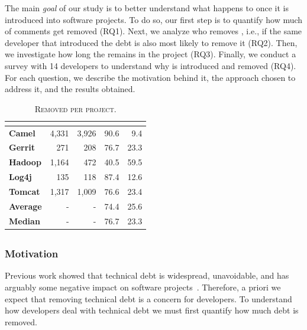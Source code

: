 The main \emph{goal} of our study is to better understand what happens to \SATD once it is introduced into software projects. To do so, our first step is to quantify how much of \SATD comments get removed (RQ1). Next, we analyze who removes \SATD, i.e., if the same developer that introduced the debt is also most likely to remove it (RQ2). Then, we investigate how long the \SATD remains in the project (RQ3). Finally, we conduct a survey with 14 developers to understand why \SATD is introduced and removed (RQ4). For each question, we describe the motivation behind it, the approach chosen to address it, and the results obtained.

\begin{table}[!t]
	\begin{center}
		\caption{\textsc{Removed \SATD per project.}}
		\label{tbl:removed_self_admitted_technical_debt_per_project}
		\begin{tabular}{l|rrrr}
			\toprule
			\textbf{\thead{Project}} & \textbf{\thead{\#identified}} & \textbf{\thead{\#removed}} & \textbf{\thead{\% removed}} &  \textbf{\thead{\% remains}}  \\ 
			\midrule
			\textbf{Camel }  &  4,331  & 3,926  & 90.6  & 9.4\\
			\textbf{Gerrit}  &  271    & 208    & 76.7 & 23.3 \\
			\textbf{Hadoop}  &  1,164  & 472    & 40.5 & 59.5 \\  
			\textbf{Log4j }  &  135    & 118    & 87.4 & 12.6\\ 
			\textbf{Tomcat}  &  1,317  & 1,009  & 76.6 & 23.4\\   
			\midrule
			\textbf{Average} & -       & -      & 74.4 & 25.6\\
			\textbf{Median} & -       & -      & 76.7 & 23.3\\
			\bottomrule
		\end{tabular}
	\end{center}    
\end{table}


\subsection*{\rqi}
\subsubsection*{Motivation} Previous work showed that technical debt is widespread, unavoidable, and has arguably some negative impact on software projects~\cite{Lim2012Software}. Therefore, a priori we expect that removing technical debt is a concern for developers. To understand how developers deal with  technical debt we must first quantify how much debt is removed. 


